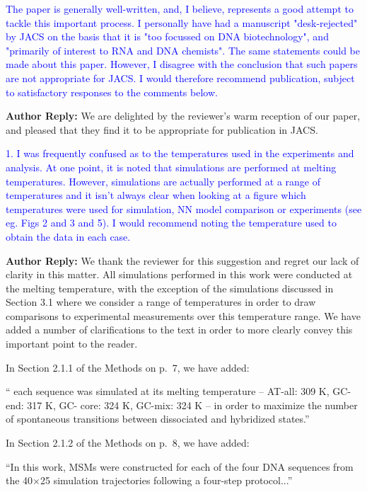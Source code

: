 \documentclass[11pt,a4paper]{letter} %
\newcommand*{\rood}[1]{{\color{red}{#1}}}
\begin{document}
\textcolor{blue}{The paper is generally well-written, and, I believe, represents a good attempt to tackle this important process. I personally have had a manuscript "desk-rejected" by JACS on the basis that it is "too focussed on DNA biotechnology", and "primarily of interest to RNA and DNA chemists". The same statements could be made about this paper. However, I disagree with the conclusion that such papers are not appropriate for JACS. I would therefore recommend publication, subject to satisfactory responses to the comments below.  }

\textbf{Author Reply:}   We are delighted by the reviewer's warm reception of our paper, and pleased that they find it to be appropriate for publication in JACS.



\textcolor{blue}{1.   I was frequently confused as to the temperatures used in the experiments and analysis. At one point, it is noted that simulations are performed at melting temperatures. However, simulations are actually performed at a range of temperatures and it isn't always clear when looking at a figure which temperatures were used for simulation, NN model comparison or experiments (see eg. Figs 2 and 3 and 5). I would recommend noting the temperature used to obtain the data in each case.}

\textbf{Author Reply:}   We thank the reviewer for this suggestion and regret our lack of clarity in this matter. All simulations performed in this work were conducted at the melting temperature, with the exception of the simulations discussed in Section 3.1 where we consider a range of temperatures in order to draw comparisons to experimental measurements over this temperature range. We have added a number of clarifications to the text in order to more clearly convey this important point to the reader.

In Section 2.1.1 of the Methods on p.~7, we have added:

``\rood{With the exception of the simulation data reported in Section 3.1 where we draw comparisons against experimental data collected over a range of temperatures,} each sequence was simulated at its melting temperature -- AT-all: 309 K, GC-end: 317 K, GC- core: 324 K, GC-mix: 324 K -- in order to maximize the number of spontaneous transitions between dissociated and hybridized states.''

In Section 2.1.2 of the Methods on p.~8, we have added:

``In this work, MSMs were constructed for each of the four DNA sequences \rood{at their respective melting temperatures} from the 40$\times$25 simulation trajectories following a four-step protocol...''
\end{document}
